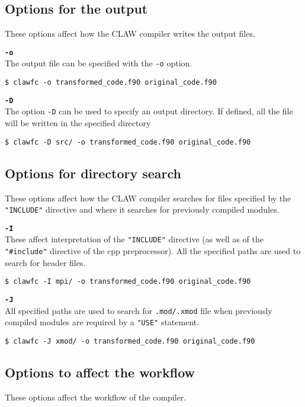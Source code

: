 \documentclass{article}
\begin{document}
\subsection{Options for the output}
These options affect how the CLAW compiler writes the output files.

\textbf{\texttt{-o}}\\
The output file can be specified with the \texttt{-o} option. 
\begin{lstlisting}
$ clawfc -o transformed_code.f90 original_code.f90
\end{lstlisting}

\textbf{\texttt{-D}}\\
The option \texttt{-D} can be used to specify an output directory. If defined, all the file 
will be written in the specified directory

\begin{lstlisting}
$ clawfc -D src/ -o transformed_code.f90 original_code.f90
\end{lstlisting}



\subsection{Options for directory search}
These options affect how the CLAW compiler searches for files specified by the
\texttt{"INCLUDE"} directive and where it searches for previously compiled modules.

\textbf{\texttt{-I}}\\
These affect interpretation of the \texttt{"INCLUDE"} directive (as well as of the \texttt{"\#include"} directive of the cpp preprocessor).
All the specified paths are used to search for header files.
\begin{lstlisting}
$ clawfc -I mpi/ -o transformed_code.f90 original_code.f90
\end{lstlisting}

\textbf{\texttt{-J}}\\
All specified paths are used to search for \texttt{.mod/.xmod} file when previously compiled modules are required by a \texttt{"USE"} statement.
\begin{lstlisting}
$ clawfc -J xmod/ -o transformed_code.f90 original_code.f90
\end{lstlisting}


\subsection{Options to affect the workflow}
These options affect the workflow of the compiler. 
\end{document}
